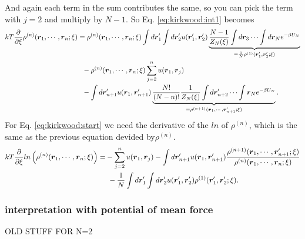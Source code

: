 And again each term in the sum contributes the same,
so you can pick the term with $j=2$ and multiply by $N-1$.
So Eq. \eqref{eq:kirkwood:int1} becomes
\begin{align}
kT\frac{\partial}{\partial \xi}
    \rho^{(n)}(\boldsymbol{r}_1,\cdots,\boldsymbol{r}_n;\xi)
&= \rho^{(n)}(\boldsymbol{r}_1,\cdots,\boldsymbol{r}_n;\xi)
        \int d\boldsymbol{r}_1' \int d\boldsymbol{r}_2' u(\boldsymbol{r}_1',\boldsymbol{r}_2')
        \underbrace{
        \frac{N-1}{Z_N(\xi)} 
        \int d\boldsymbol{r}_3 \cdots \int d\boldsymbol{r}_N e^{-\beta U_N} 
        }_{=\frac{1}{N}\rho^{(1)}(\boldsymbol{r}_1',\boldsymbol{r}_2';\xi)}
         \nonumber \\
    &~~- \rho^{(n)}(\boldsymbol{r}_1,\cdots,\boldsymbol{r}_n;\xi)
        \sum_{j=2}^{n} u(\boldsymbol{r}_1,\boldsymbol{r}_j)
        \nonumber \\
    &~~- \int d\boldsymbol{r}_{n+1}' u(\boldsymbol{r}_1,\boldsymbol{r}_{n+1}')
        \underbrace{
        \frac{N!}{(N-n)!} \frac{1}{Z_N(\xi)}
        \int d\boldsymbol{r}_{n+2}'\cdots \int \boldsymbol{r}_N e^{-\beta U_N}
        }_{=\rho^{(n+1)}(\boldsymbol{r}_1,\cdots,\boldsymbol{r}_{n+1}';\xi)}.
\nonumber
\end{align}
For Eq. \eqref{eq:kirkwood:start} we need the derivative of the $ln$ of $\rho^{(n)}$, which is the same as  the previous equation devided by$\rho^{(n)}$.
\begin{align}
kT\frac{\partial}{\partial \xi}
    ln\left(\rho^{(n)}(\boldsymbol{r}_1,\cdots,\boldsymbol{r}_n;\xi) \right)
=&- \sum_{j=2}^{n} u(\boldsymbol{r}_1,\boldsymbol{r}_j)
    - \int d\boldsymbol{r}_{n+1}' u(\boldsymbol{r}_1,\boldsymbol{r}_{n+1}')
        \frac{ \rho^{(n+1)}(\boldsymbol{r}_1,\cdots,\boldsymbol{r}_{n+1}';\xi)}
            { \rho^{(n)}(\boldsymbol{r}_1,\cdots,\boldsymbol{r}_{n};\xi)}
    \nonumber \\
&~- \frac{1}{N} \int d\boldsymbol{r}_1' \int d\boldsymbol{r}_2' u(\boldsymbol{r}_1',\boldsymbol{r}_2')
        \rho^{(1)}(\boldsymbol{r}_1',\boldsymbol{r}_2';\xi).
\nonumber
\end{align}

\subsubsection{interpretation with potential of mean force}

OLD STUFF FOR N=2

